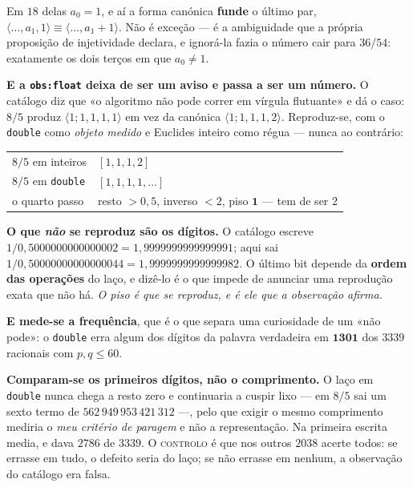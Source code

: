 \documentclass[11pt,a4paper]{article}
\newcommand{\code}[1]{\texttt{\small #1}}
\begin{document}
\medskip\noindent Em $18$ delas $a_0=1$, e aí a forma canónica \textbf{funde} o
último par, $\langle\dots,a_1,1\rangle\equiv\langle\dots,a_1+1\rangle$. Não é
exceção --- é a ambiguidade que a própria proposição de injetividade declara, e
ignorá-la fazia o número cair para $36/54$: exatamente os dois terços em que
$a_0\neq1$.

\medskip\noindent\textbf{E a \code{obs:float} deixa de ser um aviso e passa a ser um
número.} O catálogo diz que «o algoritmo não pode correr em vírgula flutuante» e dá
o caso: $8/5$ produz $\langle1;1,1,1,1\rangle$ em vez da canónica
$\langle1;1,1,1,2\rangle$. Reproduz-se, com o \texttt{double} como \emph{objeto
medido} e Euclides inteiro como régua --- nunca ao contrário:
\begin{center}
\begin{tabular}{@{}ll@{}}
\toprule
$8/5$ em inteiros & $[1,1,1,2]$\\
$8/5$ em \texttt{double} & $[1,1,1,1,\dots]$\\
o quarto passo & resto $>0{,}5$, inverso $<2$, piso $\mathbf{1}$ --- tem de ser $2$\\
\bottomrule
\end{tabular}
\end{center}

\medskip\noindent\textbf{O que \emph{não} se reproduz são os dígitos.} O catálogo
escreve $1/0{,}5000000000000002=1{,}9999999999999991$; aqui sai
$1/0{,}50000000000000044=1{,}9999999999999982$. O último bit depende da \textbf{ordem
das operações} do laço, e dizê-lo é o que impede de anunciar uma reprodução exata que
não há. \emph{O piso é que se reproduz, e é ele que a observação afirma.}

\medskip\noindent\textbf{E mede-se a frequência}, que é o que separa uma curiosidade
de um «não pode»: o \texttt{double} erra algum dos dígitos da palavra verdadeira em
$\mathbf{1301}$ dos $3339$ racionais com $p,q\le60$.

\medskip\noindent\textbf{Comparam-se os primeiros dígitos, não o comprimento.} O laço
em \texttt{double} nunca chega a resto zero e continuaria a cuspir lixo --- em $8/5$
sai um sexto termo de $562\,949\,953\,421\,312$ ---, pelo que exigir o mesmo
comprimento mediria o \emph{meu critério de paragem} e não a representação. Na
primeira escrita media, e dava $2786$ de $3339$. O \textsc{controlo} é que nos outros
$2038$ acerte todos: se errasse em tudo, o defeito seria do laço; se não errasse em
nenhum, a observação do catálogo era falsa.
\end{document}
